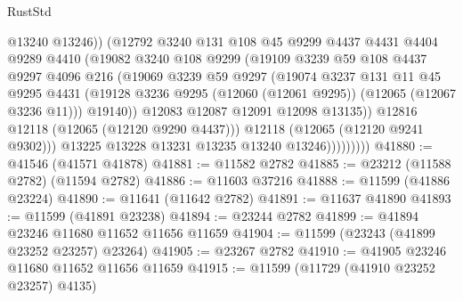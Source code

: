 \begin{lexlean}{RustStd}
\begin{coremodule}
                            @13240
                            @13246))
                        (@12792
                          @3240
                          @131
                          @108
                          @45
                          @9299
                          @4437
                          @4431
                          @4404
                          @9289
                          @4410
                          (@19082
                            @3240
                            @108
                            @9299
                            (@19109
                              @3239
                              @59
                              @108
                              @4437
                              @9297
                              @4096
                              @216
                              (@19069
                                @3239
                                @59
                                @9297
                                (@19074
                                  @3237
                                  @131
                                  @11
                                  @45
                                  @9295
                                  @4431
                                  (@19128
                                    @3236
                                    @9295
                                    (@12060 (@12061 @9295))
                                    (@12065 (@12067 @3236 @11)))
                                  @19140))
                              @12083
                              @12087
                              @12091
                              @12098
                              @13135))
                          @12816
                          @12118
                          (@12065 (@12120 @9290 @4437)))
                        @12118
                        (@12065 (@12120 @9241 @9302)))
                      @13225
                      @13228
                      @13231
                      @13235
                      @13240
                      @13246)))))))))
@41880 := @41546 (@41571 @41878)
@41881 := @11582 @2782
@41885 := @23212 (@11588 @2782) (@11594 @2782)
@41886 := @11603 @37216
@41888 := @11599 (@41886 @23224)
@41890 := @11641 (@11642 @2782)
@41891 := @11637 @41890
@41893 := @11599 (@41891 @23238)
@41894 := @23244 @2782
@41899 := @41894 @23246 @11680 @11652 @11656 @11659
@41904 := @11599 (@23243 (@41899 @23252 @23257) @23264)
@41905 := @23267 @2782
@41910 := @41905 @23246 @11680 @11652 @11656 @11659
@41915 := @11599 (@11729 (@41910 @23252 @23257) @4135)

\end{coremodule}
\end{lexlean}
